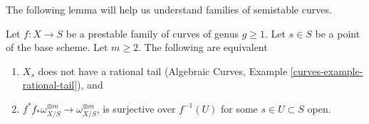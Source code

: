 \noindent
The following lemma will help us understand families of semistable curves.

\begin{lemma}
\label{lemma-semistable}
Let $f : X \to S$ be a prestable family of curves of genus $g \geq 1$.
Let $s \in S$ be a point of the base scheme. Let $m \geq 2$.
The following are equivalent
\begin{enumerate}
\item $X_s$ does not have a rational tail
(Algebraic Curves, Example \ref{curves-example-rational-tail}), and
\item $f^*f_*\omega_{X/S}^{\otimes m} \to \omega_{X/S}^{\otimes m}$,
is surjective over $f^{-1}(U)$ for some $s \in U \subset S$ open.
\end{enumerate}
\end{lemma}

